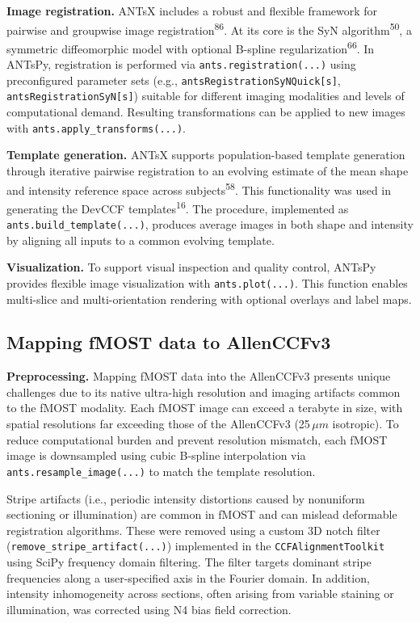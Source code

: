 \documentclass[
  12pt,
]{article}
\begin{document}
\textbf{Image registration.} ANTsX includes a robust and flexible
framework for pairwise and groupwise image
registration\textsuperscript{86}. At its core is the SyN
algorithm\textsuperscript{50}, a symmetric diffeomorphic model with
optional B-spline regularization\textsuperscript{66}. In ANTsPy,
registration is performed via \texttt{ants.registration(...)} using
preconfigured parameter sets (e.g.,
\texttt{antsRegistrationSyNQuick{[}s{]}},
\texttt{antsRegistrationSyN{[}s{]}}) suitable for different imaging
modalities and levels of computational demand. Resulting transformations
can be applied to new images with \texttt{ants.apply\_transforms(...)}.

\textbf{Template generation.} ANTsX supports population-based template
generation through iterative pairwise registration to an evolving
estimate of the mean shape and intensity reference space across
subjects\textsuperscript{58}. This functionality was used in generating
the DevCCF templates\textsuperscript{16}. The procedure, implemented as
\texttt{ants.build\_template(...)}, produces average images in both
shape and intensity by aligning all inputs to a common evolving
template.

\textbf{Visualization.} To support visual inspection and quality
control, ANTsPy provides flexible image visualization with
\texttt{ants.plot(...)}. This function enables multi-slice and
multi-orientation rendering with optional overlays and label maps.

\subsection{Mapping fMOST data to
AllenCCFv3}\label{mapping-fmost-data-to-allenccfv3}

\textbf{Preprocessing.} Mapping fMOST data into the AllenCCFv3 presents
unique challenges due to its native ultra-high resolution and imaging
artifacts common to the fMOST modality. Each fMOST image can exceed a
terabyte in size, with spatial resolutions far exceeding those of the
AllenCCFv3 (25\,\(\mu m\) isotropic). To reduce computational burden and
prevent resolution mismatch, each fMOST image is downsampled using cubic
B-spline interpolation via \texttt{ants.resample\_image(...)} to match
the template resolution.

Stripe artifacts (i.e., periodic intensity distortions caused by
nonuniform sectioning or illumination) are common in fMOST and can
mislead deformable registration algorithms. These were removed using a
custom 3D notch filter (\texttt{remove\_stripe\_artifact(...)})
implemented in the \texttt{CCFAlignmentToolkit} using SciPy frequency
domain filtering. The filter targets dominant stripe frequencies along a
user-specified axis in the Fourier domain. In addition, intensity
inhomogeneity across sections, often arising from variable staining or
illumination, was corrected using N4 bias field correction.
\end{document}
